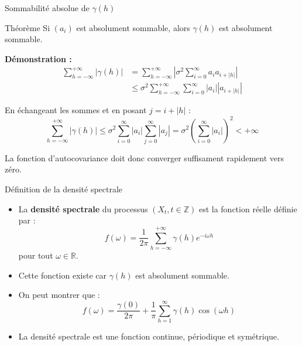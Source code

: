 \documentclass[11pt,aspectratio=169]{beamer}
\newcommand{\R}{\mathbb{R}}
\newcommand{\Z}{\mathbb{Z}}
\begin{document}
\begin{frame}{Sommabilité absolue de $\gamma(h)$}
\begin{block}{Théorème}
Si $(a_i)$ est absolument sommable, alors $\gamma(h)$ est absolument sommable.
\end{block}

\textbf{Démonstration :}
\begin{align*}
\sum_{h=-\infty}^{+\infty} |\gamma(h)| &= \sum_{h=-\infty}^{+\infty} \left| \sigma^2 \sum_{i=0}^{\infty} a_i a_{i+|h|} \right| \\
&\leq \sigma^2 \sum_{h=-\infty}^{+\infty} \sum_{i=0}^{\infty} |a_i| |a_{i+|h|}|
\end{align*}

En échangeant les sommes et en posant $j = i + |h|$ :
\[
\sum_{h=-\infty}^{+\infty} |\gamma(h)| \leq \sigma^2 \sum_{i=0}^{\infty} |a_i| \sum_{j=0}^{\infty} |a_j| = \sigma^2 \left( \sum_{i=0}^{\infty} |a_i| \right)^2 < +\infty
\]

La fonction d'autocovariance doit donc converger suffisament rapidement vers zéro.
\end{frame}

\begin{frame}{Définition de la densité spectrale}

\begin{itemize}

\item La \textbf{densité spectrale} du processus $(X_t, t \in \Z)$ est la fonction réelle définie par :
  \[
  f(\omega) = \frac{1}{2\pi} \sum_{h=-\infty}^{+\infty} \gamma(h) e^{-i\omega h}
  \]
  pour tout $\omega \in \R$.\newline

\item Cette fonction existe car $\gamma(h)$ est absolument sommable.\newline

\item On peut montrer que :
  \[
  f(\omega) = \frac{\gamma(0)}{2\pi} + \frac{1}{\pi} \sum_{h=1}^{\infty} \gamma(h) \cos(\omega h)
  \]\newline

\item La densité spectrale est une fonction continue, périodique et symétrique.

\end{itemize}

\end{frame}
\end{document}
